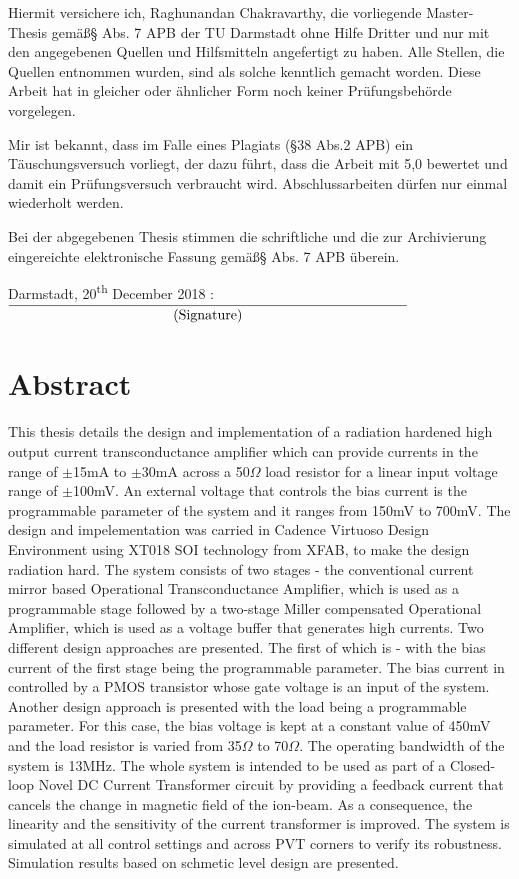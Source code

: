 \documentclass[linedtoc,
               parskip,
               twoside,
               longdoc,
               11pt,
               noheadingspace,
               accentcolor=tud1d,
               bigchapter,
               colorback]{tudreport}
\begin{document}
Hiermit versichere ich, Raghunandan Chakravarthy, die vorliegende Master-Thesis gem\"a\ss\enspace\S{} Abs. 7 APB der TU Darmstadt ohne Hilfe Dritter und nur mit den angegebenen Quellen und Hilfsmitteln angefertigt zu haben. Alle Stellen, die Quellen entnommen wurden, sind als solche kenntlich gemacht worden. Diese Arbeit hat in gleicher oder \"ahnlicher Form noch keiner Pr\"ufungsbeh\"orde vorgelegen.

Mir ist bekannt, dass im Falle eines Plagiats (\S38 Abs.2 APB) ein T\"auschungsversuch vorliegt, der dazu f\"uhrt, dass die Arbeit mit 5,0 bewertet und damit ein Pr\"ufungsversuch verbraucht wird. Abschlussarbeiten d\"urfen nur einmal wiederholt werden.

Bei der abgegebenen Thesis stimmen die schriftliche und die zur Archivierung eingereichte elektronische Fassung gem\"a\ss\enspace\S{} Abs. 7 APB \"uberein.
\hfill \break

Darmstadt, 20\textsuperscript{th} December 2018 : $\underset{\text{\normalsize(Signature)}}{\underline{\hspace{10cm}}}$

\chapter*{Abstract}
This thesis details the design and implementation of a radiation hardened high output current transconductance amplifier which can provide currents in the range of $\pm$15mA to $\pm$30mA across a 50$\Omega$ load resistor for a linear input voltage range of $\pm$100mV. An external voltage that controls the bias current is the programmable parameter of the system and it ranges from 150mV to 700mV. The design and impelementation was carried in Cadence Virtuoso Design Environment using XT018 SOI technology from XFAB, to make the design radiation hard. The system consists of two stages - the conventional current mirror based Operational Transconductance Amplifier, which is used as a programmable stage followed by a two-stage Miller compensated Operational Amplifier, which is used as a voltage buffer that generates high currents. Two different design approaches are presented. The first of which is - with the bias current of the first stage being the programmable parameter. The bias current in controlled by a PMOS transistor whose gate voltage is an input of the system. Another design approach is presented with the load being a programmable parameter. For this case, the bias voltage is kept at a constant value of 450mV and the load resistor is varied from 35$\Omega$ to 70$\Omega$. The operating bandwidth of the system is 13MHz. The whole system is intended to be used as part of a Closed-loop Novel DC Current Transformer circuit by providing a feedback current that cancels the change in magnetic field of the ion-beam. As a consequence, the linearity and the sensitivity of the current transformer is improved. The system is simulated at all control settings and across PVT corners to verify its robustness. Simulation results based on schmetic level design are presented.
\end{document}
